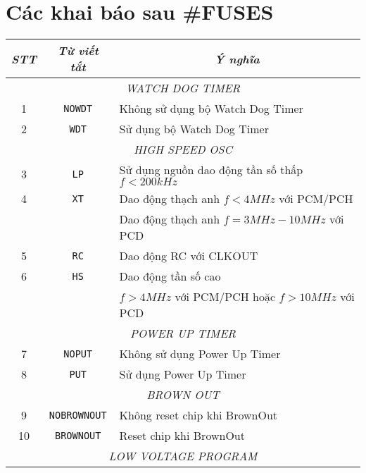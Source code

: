 \chapter{Các khai báo sau \#FUSES}
\begin{table}[!h]
\vspace{-2cm}
\begin{center}
\begin{longtable}{|c|c|c|c|}\hline
\textit{STT} & \textit{Từ viết tắt} & \multicolumn{2}{|c|}{\textit{Ý nghĩa}} \\ \hline
\multicolumn{4}{|c|}{\textit{WATCH DOG TIMER}}\\ \hline
1 & \verb|NOWDT| & \multicolumn{2}{|l|}{Không sử dụng bộ Watch Dog Timer} \\ \hline
2 & \verb|WDT| & \multicolumn{2}{|l|}{Sử dụng bộ Watch Dog Timer} \\ \hline
\multicolumn{4}{|c|}{\textit{HIGH SPEED OSC}}\\ \hline
3 & \verb|LP| & \multicolumn{2}{|l|}{Sử dụng nguồn dao động tần số thấp $f<200kHz$} \\ \hline
4 & \verb|XT| & \multicolumn{2}{|l|}{Dao động thạch anh $f<4MHz$ với PCM/PCH} \\ \cline{3-4}
 &  & \multicolumn{2}{|l|}{Dao động thạch anh $f=3MHz-10MHz$ với PCD} \\ \hline
5 & \verb|RC| & \multicolumn{2}{|l|}{Dao động RC với CLKOUT} \\ \hline
6 & \verb|HS| & \multicolumn{2}{|l|}{Dao động tần số cao} \\ \cline{3-4}
 &  & \multicolumn{2}{|l|}{$f>4MHz$ với PCM/PCH hoặc $f>10MHz$ với PCD} \\ \hline
 \multicolumn{4}{|c|}{\textit{POWER UP TIMER}}\\ \hline
7 & \verb|NOPUT| & \multicolumn{2}{|l|}{Không sử dụng Power Up Timer} \\ \hline
8 & \verb|PUT| & \multicolumn{2}{|l|}{Sử dụng Power Up Timer} \\ \hline
\multicolumn{4}{|c|}{\textit{BROWN OUT}}\\ \hline
9 & \verb|NOBROWNOUT| & \multicolumn{2}{|l|}{Không reset chip khi BrownOut} \\ \hline
10 & \verb|BROWNOUT| & \multicolumn{2}{|l|}{Reset chip khi BrownOut} \\ \hline
\multicolumn{4}{|c|}{\textit{LOW VOLTAGE PROGRAM}}\\ \hline

\end{longtable}
\end{center}
\end{table}
